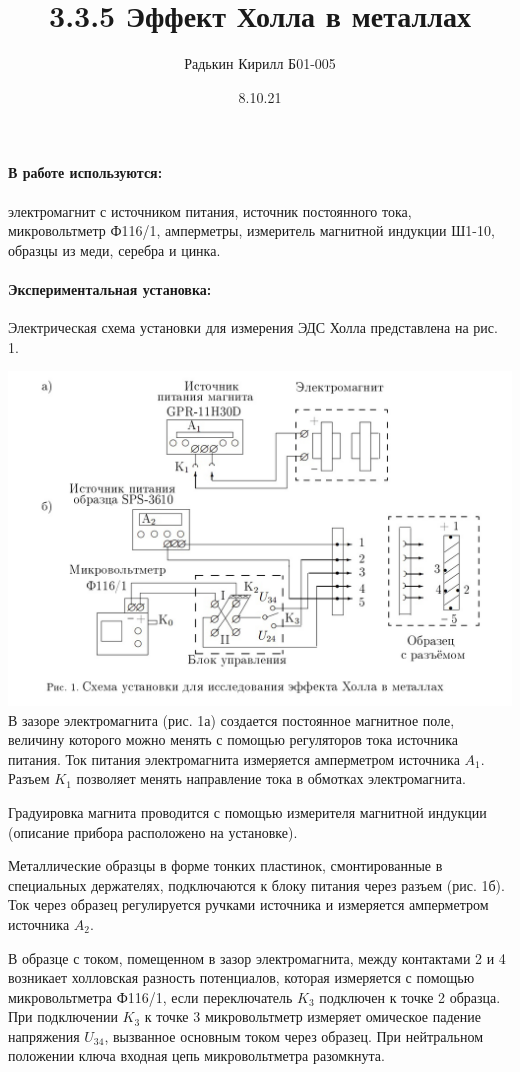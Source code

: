 \documentclass[a4paper, 12pt]{article}
\author{Радькин Кирилл Б01-005}
\title{3.3.5 Эффект Холла в металлах}
\date{8.10.21}
\newcommand{\parag}[1]{\paragraph*{#1:}}
\begin{document}
    \maketitle

    \parag{В работе используются} электромагнит с источником питания, источник постоянного тока, микровольтметр Ф116/1, амперметры, измеритель магнитной индукции Ш1-10, образцы из меди, серебра и цинка.

    \parag{Экспериментальная установка} Электрическая схема установки для измерения ЭДС Холла представлена на рис. 1.

    \includegraphics[width=\linewidth]{pic1.jpg}
    \\

    В зазоре электромагнита (рис. 1а) создается постоянное магнитное поле, величину которого можно менять с помощью регуляторов тока источника питания. 
    Ток питания электромагнита измеряется амперметром источника $A_1$. 
    Разъем $K_1$ позволяет менять направление тока в обмотках электромагнита. 

    Градуировка магнита проводится с помощью измерителя магнитной индукции (описание прибора расположено на установке).

    Металлические образцы в форме тонких пластинок, смонтированные в специальных держателях, подключаются к блоку питания через разъем (рис. 1б).
    Ток через образец регулируется ручками источника и измеряется амперметром источника $A_2$.

    В образце с током, помещенном в зазор электромагнита, между контактами 2 и 4 возникает холловская разность потенциалов, которая измеряется с помощью микровольтметра Ф116/1, если переключатель $K_3$ подключен к точке 2 образца.
    При подключении $K_3$ к точке 3 микровольтметр измеряет омическое падение напряжения $U_{34}$, вызванное основным током через образец.
    При нейтральном положении ключа входная цепь микровольтметра разомкнута.
    
\end{document}
